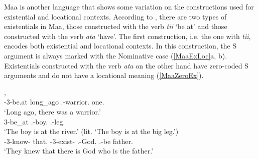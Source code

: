Maa is another language that shows some variation on the constructions used for existential and locational contexts. 
According to \citet{Payne:2007}, there are two types of existentials in Maa, those constructed with the verb \emph{tii} `be at' and those constructed with the verb \emph{ata} `have'. %
The first construction, i.e. the one with \emph{tii}, encodes both existential and locational contexts. 
In this construction, the S argument is always marked with the  Nominative case (\ref{MaaExLoc}a, b).
Existentials constructed with the verb \emph{ata} on the other hand have zero-coded S arguments and do not have a locational meaning (\ref{MaaZeroEx}).


\begin{exe}
 \ex\label{MaaExLoc}
\begin{xlist}
\ex\gll {} , \textbf{} \textbf{}\\
        \con{}-3-be.at long\_ago \mas{}.\sg{}-warrior.\nom{} one.\nom{}\\
\glt `Long ago, there was a warrior.'
\ex\gll{} \textbf{} \\
       3-be\_at \fem{}.\sg{}-boy.\nom{} \mas{}.\sg{}-leg.\acc{}\\
\glt `The boy is at the river.' (lit. `The boy is at the big leg.')
\ex\label{MaaZeroEx} \gll {}     \textbf{}  \\
\con{}-3-know-\incep{} that.\pl{} \dscn{}-3-exist-\pass{} \fem{}.\sg{}-God.\acc{} \relativ{}.\fem{}-be father.\acc{}\\
\glt `They knew that there is God who is the father.'
\end{xlist}
\end{exe}


